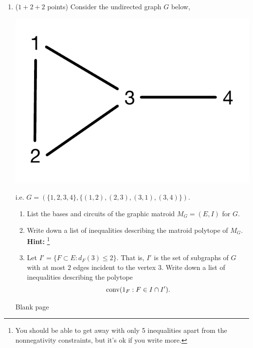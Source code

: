 \documentclass[12pt]{article}
\begin{document}
\begin{enumerate}
\item ($1 + 2+ 2$ points) Consider the undirected graph $G$ below,
\begin{center}
\includegraphics[scale=.5]{../figures/final-graph.pdf}
\end{center}
i.e. $G = (\{1,2,3,4\}, \{(1,2), (2,3), (3,1), (3,4)\})$.
\begin{enumerate}
\item List the bases and circuits of the graphic matroid $M_G = (E, I)$ for $G$.
\item Write down a list of inequalities describing the matroid polytope of $M_G$. \textbf{Hint: }\footnote{You should be able to get away with only 5 inequalities apart from the nonnegativity constraints, but it's ok if you write more.}
\item Let $I' = \{F \subset E:  d_F(3) \leq 2\}$. That is, $I'$ is the set of subgraphs of $G$ with at most $2$ edges incident to the vertex $3$. Write down a list of inequalities describing the polytope
$$ \operatorname{conv}(1_F: F \in I \cap I').$$
\end{enumerate}


\newpage 
Blank page

\newpage

\end{enumerate}
\end{document}
